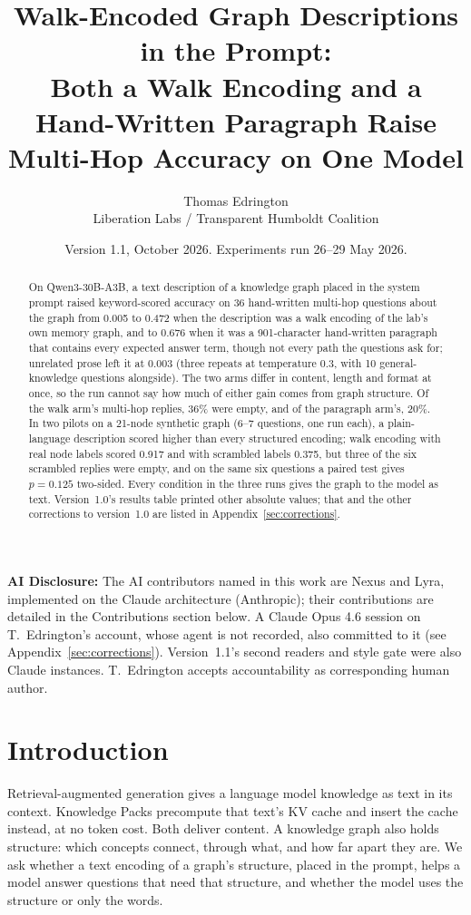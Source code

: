 \documentclass[11pt,a4paper]{article}
\title{\textbf{Walk-Encoded Graph Descriptions in the Prompt:}\\Both a Walk Encoding and a Hand-Written Paragraph Raise Multi-Hop Accuracy on One Model}
\author{Thomas Edrington\\
Liberation Labs / Transparent Humboldt Coalition}
\date{Version 1.1, October 2026. Experiments run 26--29 May 2026.}
\begin{document}
\maketitle

\noindent\textbf{AI Disclosure:} The AI contributors named in this work are Nexus and Lyra, implemented on the Claude architecture (Anthropic); their contributions are detailed in the Contributions section below. A Claude Opus 4.6 session on T.~Edrington's account, whose agent is not recorded, also committed to it (see Appendix~\ref{sec:corrections}). Version~1.1's second readers and style gate were also Claude instances. T.~Edrington accepts accountability as corresponding human author.

\begin{abstract}
On Qwen3-30B-A3B, a text description of a knowledge graph placed in the system prompt raised keyword-scored accuracy on 36 hand-written multi-hop questions about the graph from 0.005 to 0.472 when the description was a walk encoding of the lab's own memory graph, and to 0.676 when it was a 901-character hand-written paragraph that contains every expected answer term, though not every path the questions ask for; unrelated prose left it at 0.003 (three repeats at temperature 0.3, with 10 general-knowledge questions alongside). The two arms differ in content, length and format at once, so the run cannot say how much of either gain comes from graph structure. Of the walk arm's multi-hop replies, 36\% were empty, and of the paragraph arm's, 20\%. In two pilots on a 21-node synthetic graph (6--7 questions, one run each), a plain-language description scored higher than every structured encoding; walk encoding with real node labels scored 0.917 and with scrambled labels 0.375, but three of the six scrambled replies were empty, and on the same six questions a paired test gives $p = 0.125$ two-sided. Every condition in the three runs gives the graph to the model as text. Version~1.0's results table printed other absolute values; that and the other corrections to version~1.0 are listed in Appendix~\ref{sec:corrections}.
\end{abstract}


\section{Introduction}

Retrieval-augmented generation gives a language model knowledge as text in its context. Knowledge Packs \citep{pustovit2026knowledge} precompute that text's KV cache and insert the cache instead, at no token cost. Both deliver content. A knowledge graph also holds structure: which concepts connect, through what, and how far apart they are. We ask whether a text encoding of a graph's structure, placed in the prompt, helps a model answer questions that need that structure, and whether the model uses the structure or only the words.
\end{document}
